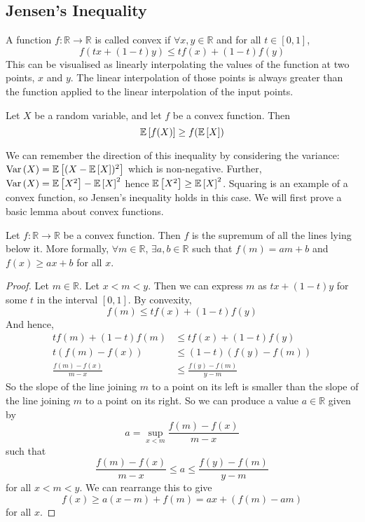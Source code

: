\subsection{Jensen's Inequality}
\begin{definition}
	A function \(f\colon \mathbb R \to \mathbb R\) is called convex if \(\forall x, y \in \mathbb R\) and for all \(t \in [0, 1]\),
	\[
		f(tx + (1-t)y) \leq tf(x) + (1-t)f(y)
	\]
	This can be visualised as linearly interpolating the values of the function at two points, \(x\) and \(y\).
	The linear interpolation of those points is always greater than the function applied to the linear interpolation of the input points.
\end{definition}
\begin{theorem}
	Let \(X\) be a random variable, and let \(f\) be a convex function.
	Then
	\[
		\mathbb{E}\left[{f(X)}\right] \geq f(\mathbb{E}\left[{X}\right])
	\]
\end{theorem}
\noindent We can remember the direction of this inequality by considering the variance: \(\operatorname{Var}\left({X}\right) = \mathbb{E}\left[{(X - \mathbb{E}\left[{X}\right])^2}\right]\) which is non-negative.
Further, \(\operatorname{Var}\left({X}\right) = \mathbb{E}\left[{X^2}\right] - \mathbb{E}\left[{X}\right]^2\) hence \(\mathbb{E}\left[{X^2}\right] \geq \mathbb{E}\left[{X}\right]^2\).
Squaring is an example of a convex function, so Jensen's inequality holds in this case.
We will first prove a basic lemma about convex functions.
\begin{lemma}
	Let \(f \colon \mathbb R \to \mathbb R\) be a convex function.
	Then \(f\) is the supremum of all the lines lying below it.
	More formally, \(\forall m \in \mathbb R\), \(\exists a, b \in \mathbb R\) such that \(f(m) = am + b\) and \(f(x) \geq ax + b\) for all \(x\).
\end{lemma}
\begin{proof}
	Let \(m \in \mathbb R\).
	Let \(x < m < y\).
	Then we can express \(m\) as \(tx + (1-t)y\) for some \(t\) in the interval \([0, 1]\).
	By convexity,
	\[
		f(m) \leq tf(x) + (1-t)f(y)
	\]
	And hence,
	\begin{align*}
		tf(m) + (1-t)f(m)         & \leq tf(x) + (1-t)f(y)       \\
		t(f(m) - f(x))            & \leq (1-t)(f(y) - f(m))      \\
		\frac{f(m) - f(x)}{m - x} & \leq \frac{f(y) - f(m)}{y-m}
	\end{align*}
	So the slope of the line joining \(m\) to a point on its left is smaller than the slope of the line joining \(m\) to a point on its right.
	So we can produce a value \(a \in \mathbb R\) given by
	\[
		a = \sup_{x < m} \frac{f(m) - f(x)}{m - x}
	\]
	such that
	\[
		\frac{f(m) - f(x)}{m - x} \leq a \leq \frac{f(y) - f(m)}{y - m}
	\]
	for all \(x < m < y\).
	We can rearrange this to give
	\[
		f(x) \geq a(x-m) + f(m) = ax + (f(m) - am)
	\]
	for all \(x\).
\end{proof}
